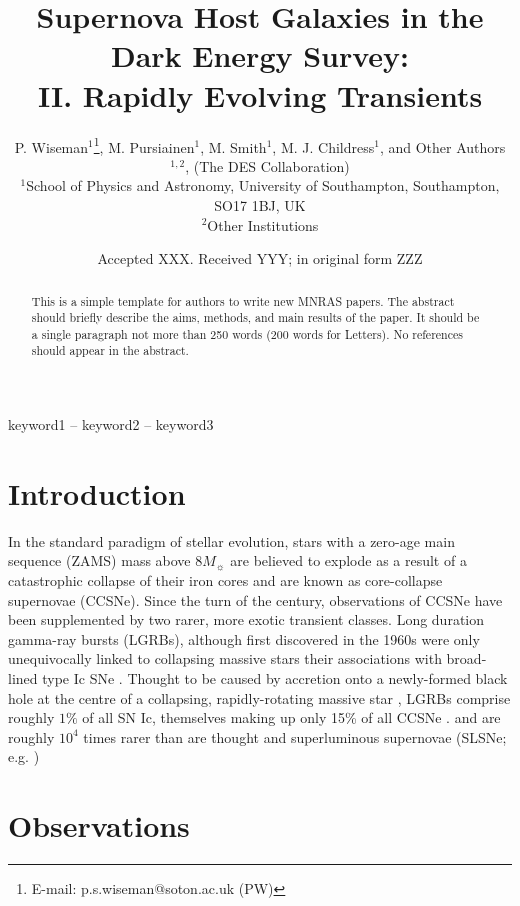 \documentclass[fleqn,usenatbib,]{mnras}
\title[Supernova hosts in DES]{Supernova Host Galaxies in the Dark Energy Survey: \\ II. Rapidly Evolving Transients}
\author[P. Wiseman et al.]{
P. Wiseman$^1$\thanks{E-mail: p.s.wiseman@soton.ac.uk (PW)},
 M. Pursiainen$^1$,
 M. Smith$^1$,
 M. J. Childress$^1$,
 and Other Authors$^{1,2}$,
\newauthor
(The DES Collaboration)
\\
$^{1}$School of Physics and Astronomy, University of Southampton, Southampton, SO17 1BJ, UK\\
$^{2}$Other Institutions\\
}
\date{Accepted XXX. Received YYY; in original form ZZZ}
\begin{document}
\label{firstpage}
\pagerange{\pageref{firstpage}--\pageref{lastpage}}
\maketitle

\begin{abstract}
This is a simple template for authors to write new MNRAS papers.
The abstract should briefly describe the aims, methods, and main results of the paper.
It should be a single paragraph not more than 250 words (200 words for Letters).
No references should appear in the abstract.
\end{abstract}

\begin{keywords}
keyword1 -- keyword2 -- keyword3
\end{keywords}



\section{Introduction}



In the standard paradigm of stellar evolution, stars with a zero-age main sequence (ZAMS) mass above $8M_{\sun}$ are believed to explode as a result of a catastrophic collapse of their iron cores and are known as core-collapse supernovae (CCSNe). Since the turn of the century, observations of CCSNe have been supplemented by two rarer, more exotic transient classes. Long duration gamma-ray bursts (LGRBs), although first discovered in the 1960s \citep{Klebesadel1973} were only unequivocally linked to collapsing massive stars their associations with broad-lined type Ic SNe \citep{Galama1998,Hjorth2003}. Thought to be caused by accretion onto a newly-formed black hole at the centre of a collapsing, rapidly-rotating massive star \citep[][e.g.]{Woosley1993,Woosley1996a,Woosley1996b}, LGRBs comprise roughly $1\%$ of all SN Ic, themselves making up only 15\% of all CCSNe \citep{Kelly2012,Graham2016}.    and are roughly $10^4$ times rarer than  are thought and superluminous supernovae (SLSNe; e.g. \citealt{Quimby2011; Gal-Yam2012}) 

\section{Observations\label{sec:obs}}
\end{document}
